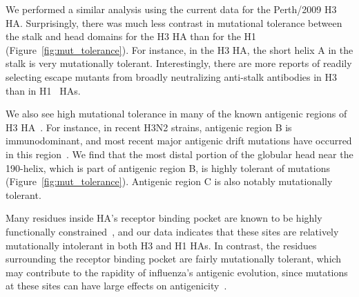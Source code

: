 \documentclass[9pt,twocolumn,twoside]{pnas-new}
\begin{document}
We performed a similar analysis using the current data for the Perth/2009 H3 HA.
Surprisingly, there was much less contrast in mutational tolerance between the stalk and head domains for the H3 HA than for the H1 (Figure~\ref{fig:mut_tolerance}).
For instance, in the H3 HA, the short helix A in the stalk is very mutationally tolerant.
Interestingly, there are more reports of readily selecting escape mutants from broadly neutralizing anti-stalk antibodies in H3~\cite{ekiert2011highly, friesen2014common, chai2016two, yamayoshi2017human} than in H1~\cite{okuno1993common,doud2017quantifying,anderson2017natural} HAs.

We also see high mutational tolerance in many of the known antigenic regions of H3 HA~\cite{wiley1981structural}.
For instance, in recent H3N2 strains, antigenic region B is immunodominant, and most recent major antigenic drift mutations have occurred in this region~\cite{chambers2015identification,koel2013substitutions,popova2012immunodominance}.
We find that the most distal portion of the globular head near the 190-helix, which is part of antigenic region B, is highly tolerant of mutations (Figure~\ref{fig:mut_tolerance}).
Antigenic region C is also notably mutationally tolerant.

Many residues inside HA's receptor binding pocket are known to be highly functionally constrained~\cite{wilson1981structure,martin1998studies}, and our data indicates that these sites are relatively mutationally intolerant in both H3 and H1 HAs.
In contrast, the residues surrounding the receptor binding pocket are fairly mutationally tolerant, which may contribute to the rapidity of influenza's antigenic evolution, since mutations at these sites can have large effects on antigenicity~\cite{wiley1981structural,koel2013substitutions}.
\end{document}
